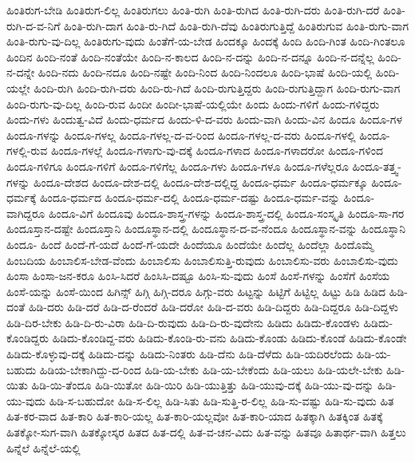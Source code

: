 {ಹಿಂತಿರುಗ-ಬೇಡಿ
ಹಿಂತಿರುಗ-ಲಿಲ್ಲ
ಹಿಂತಿರುಗಲು
ಹಿಂತಿ-ರುಗಿ
ಹಿಂತಿ-ರುಗಿದ
ಹಿಂತಿ-ರುಗಿ-ದರು
ಹಿಂತಿ-ರುಗಿ-ದರೆ
ಹಿಂತಿ-ರುಗಿ-ದ-ವ-ನಿಗೆ
ಹಿಂತಿ-ರುಗಿ-ದಾಗ
ಹಿಂತಿ-ರು-ಗಿದೆ
ಹಿಂತಿ-ರುಗಿ-ದೆವು
ಹಿಂತಿರುಗುತ್ತಿದ್ದೆ
ಹಿಂತಿರುಗುವ
ಹಿಂತಿ-ರುಗು-ವಾಗ
ಹಿಂತಿ-ರುಗು-ವು-ದಿಲ್ಲ
ಹಿಂತಿರುಗು-ವುದು
ಹಿಂತೆಗೆ-ಯ-ಬೇಡ
ಹಿಂದಕ್ಕೂ
ಹಿಂದಕ್ಕೆ
ಹಿಂದಿ
ಹಿಂದಿ-ಗಿಂತ
ಹಿಂದಿ-ಗಿಂತಲೂ
ಹಿಂದಿನ
ಹಿಂದಿ-ನಂತೆ
ಹಿಂದಿ-ನಂತೆಯೇ
ಹಿಂದಿ-ನ-ಕಾಲದ
ಹಿಂದಿ-ನ-ದನ್ನು
ಹಿಂದಿ-ನ-ದನ್ನೂ
ಹಿಂದಿ-ನ-ದನ್ನೆಲ್ಲ
ಹಿಂದಿ-ನ-ದನ್ನೇ
ಹಿಂದಿ-ನದು
ಹಿಂದಿ-ನದೂ
ಹಿಂದಿ-ನಷ್ಟೇ
ಹಿಂದಿ-ನಿಂದ
ಹಿಂದಿ-ನಿಂದಲೂ
ಹಿಂದಿ-ಭಾಷೆ
ಹಿಂದಿ-ಯಲ್ಲಿ
ಹಿಂದಿ-ಯಲ್ಲೇ
ಹಿಂದಿ-ರುಗಿ
ಹಿಂದಿ-ರುಗಿ-ದರು
ಹಿಂದಿ-ರು-ಗಿದೆ
ಹಿಂದಿ-ರುಗುತ್ತಿದ್ದರು
ಹಿಂದಿ-ರುಗುತ್ತಿದ್ದಾಗ
ಹಿಂದಿ-ರುಗು-ವಾಗ
ಹಿಂದಿ-ರುಗು-ವು-ದಿಲ್ಲ
ಹಿಂದಿ-ರುವ
ಹಿಂದೀ
ಹಿಂದೀ-ಭಾಷೆ-ಯಲ್ಲಿಯೇ
ಹಿಂದು
ಹಿಂದು-ಗಳಿಗೆ
ಹಿಂದು-ಗಳಿದ್ದರು
ಹಿಂದು-ಗಳು
ಹಿಂದುತ್ವ-ವಿದೆ
ಹಿಂದು-ಧರ್ಮದ
ಹಿಂದು-ಳಿ-ದ-ವರು
ಹಿಂದು-ವಾಗಿ
ಹಿಂದು-ವಿನ
ಹಿಂದೂ
ಹಿಂದೂ-ಗಳ
ಹಿಂದೂ-ಗಳನ್ನು
ಹಿಂದೂ-ಗಳಲ್ಲ
ಹಿಂದೂ-ಗಳಲ್ಲ-ದ-ವ-ರಿಂದ
ಹಿಂದೂ-ಗಳಲ್ಲ-ದ-ವರು
ಹಿಂದೂ-ಗಳಲ್ಲಿ
ಹಿಂದೂ-ಗಳಲ್ಲಿ-ರುವ
ಹಿಂದೂ-ಗಳಲ್ಲೆ
ಹಿಂದೂ-ಗಳಾಗು-ವು-ದಕ್ಕೆ
ಹಿಂದೂ-ಗಳಾದ
ಹಿಂದೂ-ಗಳಾದರೋ
ಹಿಂದೂ-ಗಳಿಂದ
ಹಿಂದೂ-ಗಳಿಗೂ
ಹಿಂದೂ-ಗಳಿಗೆ
ಹಿಂದೂ-ಗಳಿಗೆಲ್ಲ
ಹಿಂದೂ-ಗಳು
ಹಿಂದೂ-ಗಳೂ
ಹಿಂದೂ-ಗಳೆಲ್ಲರೂ
ಹಿಂದೂ-ತತ್ತ್ವ-ಗಳನ್ನು
ಹಿಂದೂ-ದೇಶದ
ಹಿಂದೂ-ದೇಶ-ದಲ್ಲಿ
ಹಿಂದೂ-ದೇಶ-ದಲ್ಲಿದ್ದ
ಹಿಂದೂ-ಧರ್ಮ
ಹಿಂದೂ-ಧರ್ಮಕ್ಕೂ
ಹಿಂದೂ-ಧರ್ಮಕ್ಕೆ
ಹಿಂದೂ-ಧರ್ಮದ
ಹಿಂದೂ-ಧರ್ಮ-ದಲ್ಲಿ
ಹಿಂದೂ-ಧರ್ಮ-ದಷ್ಟು
ಹಿಂದೂ-ಧರ್ಮ-ವನ್ನು
ಹಿಂದೂ-ವಾಗಿದ್ದರೂ
ಹಿಂದೂ-ವಿಗೆ
ಹಿಂದೂವು
ಹಿಂದೂ-ಶಾಸ್ತ್ರ-ಗಳನ್ನು
ಹಿಂದೂ-ಶಾಸ್ತ್ರ-ದಲ್ಲಿ
ಹಿಂದೂ-ಸಂಸ್ಕೃತಿ
ಹಿಂದೂ-ಸಾ-ಗರ
ಹಿಂದೂಸ್ತಾನ-ದಷ್ಟೇ
ಹಿಂದೂಸ್ತಾನಿ
ಹಿಂದೂಸ್ಥಾನ-ದಲ್ಲಿ
ಹಿಂದೂಸ್ಥಾನ-ದ-ವ-ನೆಂದೂ
ಹಿಂದೂಸ್ಥಾನ-ವನ್ನು
ಹಿಂದೂಸ್ಥಾನಿ
ಹಿಂದೂ-
ಹಿಂದೆ
ಹಿಂದೆ-ಗೆ-ಯದೆ
ಹಿಂದೆ-ಗೆ-ಯದೇ
ಹಿಂದೆಯೂ
ಹಿಂದೆಯೇ
ಹಿಂದೆಲ್ಲ
ಹಿಂದೆಲ್ಲಾ
ಹಿಂದೊಮ್ಮೆ
ಹಿಂಬದಿಯ
ಹಿಂಬಾಲಿಸ-ಬೇಡ-ವೆಂದು
ಹಿಂಬಾಲಿಸು
ಹಿಂಬಾಲಿಸುತ್ತಿ-ರುವುದು
ಹಿಂಬಾಲಿಸು-ವರು
ಹಿಂಬಾಲಿಸು-ವುದು
ಹಿಂಸಾ
ಹಿಂಸಾ-ಜನ-ಕರೂ
ಹಿಂಸಿ-ಸಿದರೆ
ಹಿಂಸಿಸಿ-ದಷ್ಟೂ
ಹಿಂಸಿ-ಸು-ವುದು
ಹಿಂಸೆ
ಹಿಂಸೆ-ಗಳನ್ನು
ಹಿಂಸೆಗೆ
ಹಿಂಸೆಯ
ಹಿಂಸೆ-ಯನ್ನು
ಹಿಂಸೆ-ಯಿಂದ
ಹಿಗಿನ್ಸ್
ಹಿಗ್ಗಿ
ಹಿಗ್ಗಿ-ದರೂ
ಹಿಗ್ಗು-ವರು
ಹಿಟ್ಟನ್ನು
ಹಿಟ್ಟಿಗೆ
ಹಿಟ್ಟಿಲ್ಲ
ಹಿಟ್ಟು
ಹಿಡಿ
ಹಿಡಿದ
ಹಿಡಿ-ದಂತೆ
ಹಿಡಿ-ದರು
ಹಿಡಿ-ದರೆ
ಹಿಡಿ-ದ-ರೆಂದರೆ
ಹಿಡಿ-ದರೋ
ಹಿಡಿ-ದ-ವರು
ಹಿಡಿ-ದಿದ್ದರು
ಹಿಡಿ-ದಿದ್ದರೂ
ಹಿಡಿ-ದಿದ್ದಳು
ಹಿಡಿ-ದಿರ-ಬೇಕು
ಹಿಡಿ-ದಿ-ರು-ವಿರಾ
ಹಿಡಿ-ದಿ-ರುವುದು
ಹಿಡಿ-ದಿ-ರು-ವುದೇನು
ಹಿಡಿದು
ಹಿಡಿದು-ಕೊಂಡಳು
ಹಿಡಿದು-ಕೊಂಡಿದ್ದರು
ಹಿಡಿದು-ಕೊಂಡಿದ್ದ-ವರು
ಹಿಡಿದು-ಕೊಂಡಿ-ರು-ವನು
ಹಿಡಿದು-ಕೊಂಡು
ಹಿಡಿದು-ಕೊಂಡೆ
ಹಿಡಿದು-ಕೊಂಡೇ
ಹಿಡಿದು-ಕೊಳ್ಳುವು-ದಕ್ಕೆ
ಹಿಡಿದು-ದನ್ನು
ಹಿಡಿದು-ನಿಂತರು
ಹಿಡಿ-ದೆನು
ಹಿಡಿ-ದೆಳೆದು
ಹಿಡಿ-ಯದಿರಲೆಂದು
ಹಿಡಿ-ಯ-ಬಹುದು
ಹಿಡಿಯ-ಬೇಕಾಗಿದ್ದು-ದ-ರಿಂದ
ಹಿಡಿ-ಯ-ಬೇಕು
ಹಿಡಿ-ಯ-ಬೇಕೆಂದು
ಹಿಡಿ-ಯಲು
ಹಿಡಿ-ಯಲೇ-ಬೇಕು
ಹಿಡಿ-ಯಿತು
ಹಿಡಿ-ಯಿ-ತೆಂದೂ
ಹಿಡಿ-ಯಿತೋ
ಹಿಡಿ-ಯಿರಿ
ಹಿಡಿ-ಯುತ್ತಿತ್ತು
ಹಿಡಿ-ಯುವು-ದಕ್ಕೆ
ಹಿಡಿ-ಯು-ವು-ದನ್ನು
ಹಿಡಿ-ಯು-ವುದು
ಹಿಡಿ-ಸ-ಬಹುದೋ
ಹಿಡಿ-ಸ-ಲಿಲ್ಲ
ಹಿಡಿ-ಸಿತು
ಹಿಡಿ-ಸುತ್ತಿ-ರ-ಲಿಲ್ಲ
ಹಿಡಿ-ಸು-ವಷ್ಟು
ಹಿಡಿ-ಸು-ವುದು
ಹಿತ
ಹಿತ-ಕರ-ವಾದ
ಹಿತ-ಕಾರಿ
ಹಿತ-ಕಾರಿ-ಯಲ್ಲ
ಹಿತ-ಕಾರಿ-ಯಲ್ಲವೋ
ಹಿತ-ಕಾರಿ-ಯಾದ
ಹಿತಕ್ಕಾಗಿ
ಹಿತಕ್ಕಿಂತ
ಹಿತಕ್ಕೆ
ಹಿತಕ್ಕೋ-ಸುಗ-ವಾಗಿ
ಹಿತಕ್ಕೋಸ್ಕರ
ಹಿತದ
ಹಿತ-ದಲ್ಲಿ
ಹಿತ-ವ-ಚನ-ವಿದು
ಹಿತ-ವನ್ನು
ಹಿತವೂ
ಹಿತಾರ್ಥ-ವಾಗಿ
ಹಿತ್ತಲು
ಹಿನ್ನೆಲೆ
ಹಿನ್ನೆಲೆ-ಯಲ್ಲಿ
}
